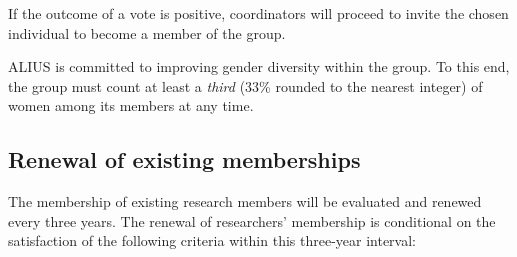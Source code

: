 \documentclass[a4paper, 11pt]{scrartcl}
\begin{document}
\noindent If the outcome of a vote is positive, coordinators will proceed to invite the chosen individual to become a member of the group.

ALIUS is committed to improving gender diversity within the group. To this end, the group must count at least a \emph{third} (33\% rounded to the nearest integer) of women among its members at any time.

\subsection{Renewal of existing memberships}
\label{membership_renewal}

The membership of existing research members will be evaluated and renewed every three years. The renewal of researchers' membership is conditional on the satisfaction of the following criteria within this three-year interval:
\end{document}
